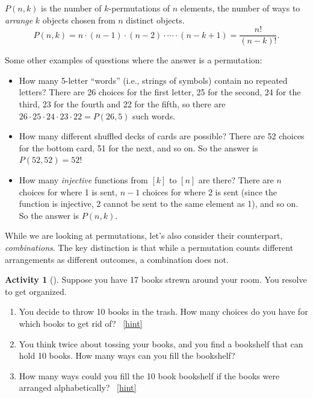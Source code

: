 \documentclass[10pt,]{book}
\theoremstyle{plain}
\theoremstyle{definition}
\theoremstyle{definition}
\theoremstyle{definition}
\newtheorem{activity}[project]{Activity}
\numberwithin{equation}{chapter}
\begin{document}
\begin{assemblage}\label{assemblage-permutation}
\hypertarget{p-209}{}%
\(P(n,k)\) is the number of \(k\)-permutations of \(n\) elements, the number of ways to \emph{arrange} \(k\) objects chosen from \(n\) distinct objects.%
\begin{equation*}
P(n,k) = n\cdot (n-1) \cdot (n-2) \cdot \cdots \cdot (n-k+1) = \frac{n!}{(n-k)!}.
\end{equation*}
%
\end{assemblage}
\hypertarget{p-210}{}%
Some other examples of questions where the answer is a permutation: \leavevmode%
\begin{itemize}[label=\textbullet]
\item{}\hypertarget{p-211}{}%
How many 5-letter ``words'' (i.e., strings of symbols) contain no repeated letters?  There are 26 choices for the first letter, 25 for the second, 24 for the third, 23 for the fourth and 22 for the fifth, so there are \(26\cdot 25 \cdot 24 \cdot 23 \cdot 22 = P(26,5)\) such words.%
\item{}\hypertarget{p-212}{}%
How many different shuffled decks of cards are possible?  There are 52 choices for the bottom card, 51 for the next, and so on.  So the answer is \(P(52,52) = 52!\)%
\item{}\hypertarget{p-213}{}%
How many \emph{injective} functions from \([k]\) to \([n]\) are there?  There are \(n\) choices for where 1 is sent, \(n-1\) choices for where \(2\) is sent (since the function is injective, 2 cannot be sent to the same element as 1), and so on.  So the answer is \(P(n,k)\).%
\end{itemize}
%
\par
\hypertarget{p-214}{}%
While we are looking at permutations, let's also consider their counterpart, \emph{combinations}. The key distinction is that while a permutation counts different arrangements as different outcomes, a combination does not.%
\begin{activity}[]\label{activity-29}
\hypertarget{p-215}{}%
Suppose you have 17 books strewn around your room.  You resolve to get organized.%
\begin{enumerate}[font=\bfseries,label=(\alph*),ref=\alph*]
\item\label{task-64} \hypertarget{p-216}{}%
You decide to throw 10 books in the trash.  How many choices do you have for which books to get rid of?%
~\hfill{\tiny\hyperlink{a-29.a}{[hint]}\hypertarget{q-29.a}{}}\item\label{task-65} \hypertarget{p-218}{}%
You think twice about tossing your books, and you find a bookshelf that can hold 10 books.  How many ways can you fill the bookshelf?%
\item\label{task-66} \hypertarget{p-219}{}%
How many ways could you fill the 10 book bookshelf if the books were arranged alphabetically?%
~\hfill{\tiny\hyperlink{a-29.c}{[hint]}\hypertarget{q-29.c}{}}\end{enumerate}
\end{activity}
\end{document}
